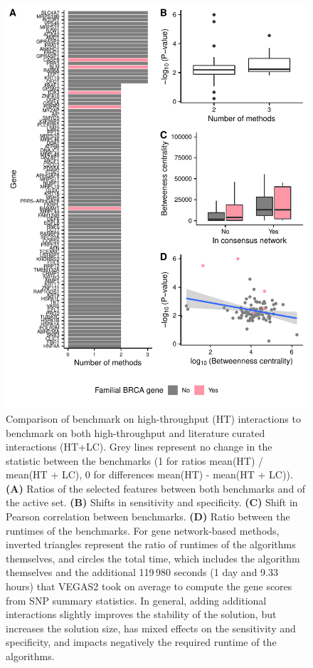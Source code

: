 \documentclass[twocolumn, 11pt]{article}
\begin{document}
\begin{figure}[htbp]
\centering
\includegraphics[width=.85\linewidth]{./figures/sfigure_8.pdf}
\caption{Comparison of benchmark on high-throughput (HT) interactions to benchmark on both high-throughput and literature curated interactions (HT+LC). Grey lines represent no change in the statistic between the benchmarks (1 for ratios mean(HT) / mean(HT + LC), 0 for differences mean(HT) - mean(HT + LC)). \textbf{(A)} Ratios of the selected features between both benchmarks and of the active set. \textbf{(B)} Shifts in sensitivity and specificity. \textbf{(C)} Shift in Pearson correlation between benchmarks. \textbf{(D)} Ratio between the runtimes of the benchmarks. For gene network-based methods, inverted triangles represent the ratio of runtimes of the algorithms themselves, and circles the total time, which includes the algorithm themselves and the additional 119\,980 seconds (1 day and 9.33 hours) that VEGAS2 took on average to compute the gene scores from SNP summary statistics. In general, adding additional interactions slightly improves the stability of the solution, but increases the solution size, has mixed effects on the sensitivity and specificity, and impacts negatively the required runtime of the algorithms.}
\label{sfig:lc_ht_comparison}
\end{figure}
\end{document}
